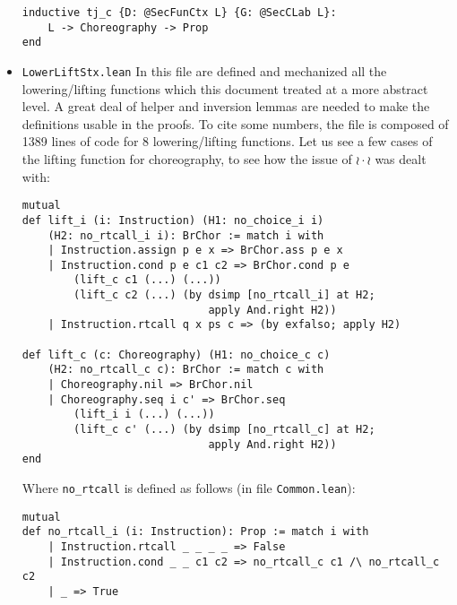 \documentclass[12pt,a4paper,twoside]{book}
\begin{document}
\begin{itemize}
\begin{samepage}
\begin{verbatim}
inductive tj_c {D: @SecFunCtx L} {G: @SecCLab L}:
    L -> Choreography -> Prop
end
\end{verbatim}
\end{samepage}
\item \texttt{LowerLiftStx.lean} In this file are defined and mechanized all the lowering/lifting functions which this document treated at a more abstract level. A great deal of helper and inversion lemmas are needed to make the definitions usable in the proofs. To cite some numbers, the file is composed of 1389 lines of code for 8 lowering/lifting functions. Let us see a few cases of the lifting function for choreography, to see how the issue of $\wr \cdot \wr$ was dealt with:
\begin{samepage}
\begin{verbatim}
mutual
def lift_i (i: Instruction) (H1: no_choice_i i)
    (H2: no_rtcall_i i): BrChor := match i with
    | Instruction.assign p e x => BrChor.ass p e x
    | Instruction.cond p e c1 c2 => BrChor.cond p e
        (lift_c c1 (...) (...))
        (lift_c c2 (...) (by dsimp [no_rtcall_i] at H2;
                             apply And.right H2))
    | Instruction.rtcall q x ps c => (by exfalso; apply H2)

def lift_c (c: Choreography) (H1: no_choice_c c)
    (H2: no_rtcall_c c): BrChor := match c with
    | Choreography.nil => BrChor.nil
    | Choreography.seq i c' => BrChor.seq
        (lift_i i (...) (...))
        (lift_c c' (...) (by dsimp [no_rtcall_c] at H2;
                             apply And.right H2))
end
\end{verbatim}
\end{samepage}
Where \texttt{no\_rtcall} is defined as follows (in file \texttt{Common.lean}):
\begin{samepage}
\begin{verbatim}
mutual
def no_rtcall_i (i: Instruction): Prop := match i with
    | Instruction.rtcall _ _ _ _ => False
    | Instruction.cond _ _ c1 c2 => no_rtcall_c c1 /\ no_rtcall_c c2
    | _ => True


\end{verbatim}
\end{samepage}
\end{itemize}
\end{document}
